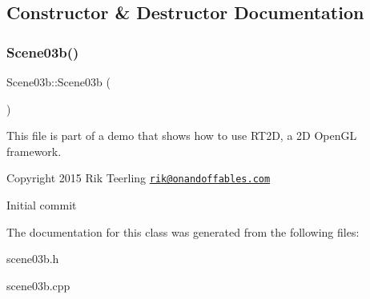 \subsection{Constructor \& Destructor Documentation}
\mbox{\label{class_scene03b_a24f82c7664305aeeaeb86ffd681d6a3f}} 
\subsubsection{\texorpdfstring{Scene03b()}{Scene03b()}}
{\footnotesize\ttfamily Scene03b\+::\+Scene03b (\begin{DoxyParamCaption}{ }\end{DoxyParamCaption})}

This file is part of a demo that shows how to use R\+T2D, a 2D Open\+GL framework.


\begin{DoxyItemize}
\item Copyright 2015 Rik Teerling \href{mailto:rik@onandoffables.com}{\tt rik@onandoffables.\+com}
\begin{DoxyItemize}
\item Initial commit 
\end{DoxyItemize}
\end{DoxyItemize}

The documentation for this class was generated from the following files\+:\begin{DoxyCompactItemize}
\item 
scene03b.\+h\item 
scene03b.\+cpp\end{DoxyCompactItemize}
